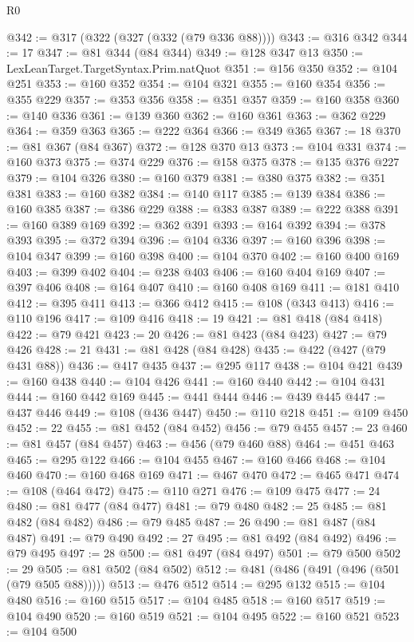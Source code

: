 \begin{lexlean}{R0}
\begin{coremodule}
@342 := @317 (@322 (@327 (@332 (@79 @336 @88))))
@343 := @316 @342
@344 := 17
@347 := @81 @344 (@84 @344)
@349 := @128 @347 @13
@350 := LexLeanTarget.TargetSyntax.Prim.natQuot
@351 := @156 @350
@352 := @104 @251
@353 := @160 @352
@354 := @104 @321
@355 := @160 @354
@356 := @355 @229
@357 := @353 @356
@358 := @351 @357
@359 := @160 @358
@360 := @140 @336
@361 := @139 @360
@362 := @160 @361
@363 := @362 @229
@364 := @359 @363
@365 := @222 @364
@366 := @349 @365
@367 := 18
@370 := @81 @367 (@84 @367)
@372 := @128 @370 @13
@373 := @104 @331
@374 := @160 @373
@375 := @374 @229
@376 := @158 @375
@378 := @135 @376 @227
@379 := @104 @326
@380 := @160 @379
@381 := @380 @375
@382 := @351 @381
@383 := @160 @382
@384 := @140 @117
@385 := @139 @384
@386 := @160 @385
@387 := @386 @229
@388 := @383 @387
@389 := @222 @388
@391 := @160 @389 @169
@392 := @362 @391
@393 := @164 @392
@394 := @378 @393
@395 := @372 @394
@396 := @104 @336
@397 := @160 @396
@398 := @104 @347
@399 := @160 @398
@400 := @104 @370
@402 := @160 @400 @169
@403 := @399 @402
@404 := @238 @403
@406 := @160 @404 @169
@407 := @397 @406
@408 := @164 @407
@410 := @160 @408 @169
@411 := @181 @410
@412 := @395 @411
@413 := @366 @412
@415 := @108 (@343 @413)
@416 := @110 @196
@417 := @109 @416
@418 := 19
@421 := @81 @418 (@84 @418)
@422 := @79 @421
@423 := 20
@426 := @81 @423 (@84 @423)
@427 := @79 @426
@428 := 21
@431 := @81 @428 (@84 @428)
@435 := @422 (@427 (@79 @431 @88))
@436 := @417 @435
@437 := @295 @117
@438 := @104 @421
@439 := @160 @438
@440 := @104 @426
@441 := @160 @440
@442 := @104 @431
@444 := @160 @442 @169
@445 := @441 @444
@446 := @439 @445
@447 := @437 @446
@449 := @108 (@436 @447)
@450 := @110 @218
@451 := @109 @450
@452 := 22
@455 := @81 @452 (@84 @452)
@456 := @79 @455
@457 := 23
@460 := @81 @457 (@84 @457)
@463 := @456 (@79 @460 @88)
@464 := @451 @463
@465 := @295 @122
@466 := @104 @455
@467 := @160 @466
@468 := @104 @460
@470 := @160 @468 @169
@471 := @467 @470
@472 := @465 @471
@474 := @108 (@464 @472)
@475 := @110 @271
@476 := @109 @475
@477 := 24
@480 := @81 @477 (@84 @477)
@481 := @79 @480
@482 := 25
@485 := @81 @482 (@84 @482)
@486 := @79 @485
@487 := 26
@490 := @81 @487 (@84 @487)
@491 := @79 @490
@492 := 27
@495 := @81 @492 (@84 @492)
@496 := @79 @495
@497 := 28
@500 := @81 @497 (@84 @497)
@501 := @79 @500
@502 := 29
@505 := @81 @502 (@84 @502)
@512 := @481 (@486 (@491 (@496 (@501 (@79 @505 @88)))))
@513 := @476 @512
@514 := @295 @132
@515 := @104 @480
@516 := @160 @515
@517 := @104 @485
@518 := @160 @517
@519 := @104 @490
@520 := @160 @519
@521 := @104 @495
@522 := @160 @521
@523 := @104 @500

\end{coremodule}
\end{lexlean}
